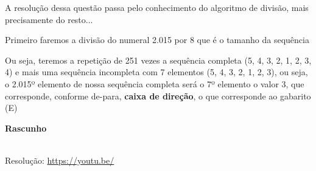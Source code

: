 \noindent {}

A resolução dessa questão passa pelo conhecimento do algoritmo de divisão, mais precisamente do resto...

Primeiro faremos a divisão do numeral 2.015 por 8 que é o tamanho da sequência 


Ou seja, teremos a repetição de 251 vezes a sequência completa (5, 4, 3, 2, 1, 2, 3, 4) e mais uma sequência incompleta com 7 elementos (5, 4, 3, 2, 1, 2, 3), ou seja, o 2.015º elemento de nossa sequência completa será o 7º elemento o valor 3, que corresponde, conforme de-para, \textbf{caixa de direção}, o que corresponde ao gabarito (E) 

\textbf{Rascunho}

\quad


\begin{center}
    \href{https://youtu.be/}{
    }\\
    Resolução: \url{https://youtu.be/}
\end{center}
